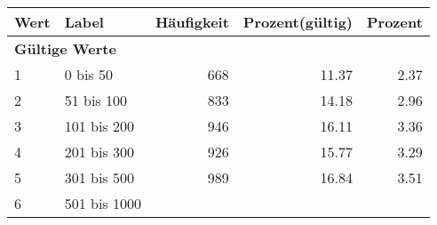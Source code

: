      \begin{longtable}{lXrrr}
     \toprule
     \textbf{Wert} & \textbf{Label} & \textbf{Häufigkeit} & \textbf{Prozent(gültig)} & \textbf{Prozent} \\
     \endhead
     \midrule
     \multicolumn{5}{l}{\textbf{Gültige Werte}}\\

     1 &
     \multicolumn{1}{X}{ 0 bis 50   } &


       \num{668} &
       \num[round-mode=places,round-precision=2]{11.37} &
         \num[round-mode=places,round-precision=2]{2.37} \\

     2 &
     \multicolumn{1}{X}{ 51 bis 100   } &


       \num{833} &
       \num[round-mode=places,round-precision=2]{14.18} &
         \num[round-mode=places,round-precision=2]{2.96} \\

     3 &
     \multicolumn{1}{X}{ 101 bis 200   } &


       \num{946} &
       \num[round-mode=places,round-precision=2]{16.11} &
         \num[round-mode=places,round-precision=2]{3.36} \\

     4 &
     \multicolumn{1}{X}{ 201 bis 300   } &


       \num{926} &
       \num[round-mode=places,round-precision=2]{15.77} &
         \num[round-mode=places,round-precision=2]{3.29} \\

     5 &
     \multicolumn{1}{X}{ 301 bis 500   } &


       \num{989} &
       \num[round-mode=places,round-precision=2]{16.84} &
         \num[round-mode=places,round-precision=2]{3.51} \\

     6 &
     \multicolumn{1}{X}{ 501 bis 1000   } &



\end{longtable}
